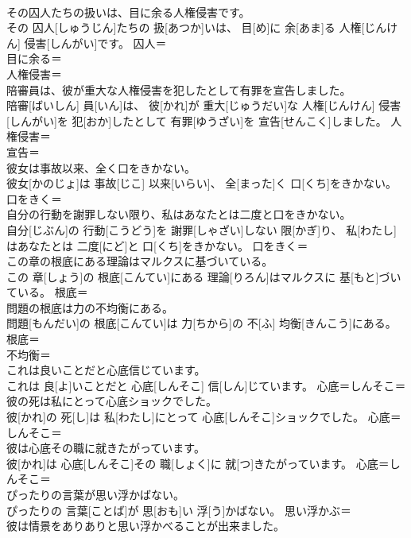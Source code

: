 \documentclass[8pt]{extreport}
\begin{document}
\begin{CJK}{UTF8}{min}
\\	その囚人たちの扱いは、目に余る人権侵害です。	
\\	その 囚人[しゅうじん]たちの 扱[あつか]いは、 目[め]に 余[あま]る 人権[じんけん] 侵害[しんがい]です。	囚人＝ 
\\	目に余る＝ 
\\	人権侵害＝ 
\\	陪審員は、彼が重大な人権侵害を犯したとして有罪を宣告しました。	
\\	陪審[ばいしん] 員[いん]は、 彼[かれ]が 重大[じゅうだい]な 人権[じんけん] 侵害[しんがい]を 犯[おか]したとして 有罪[ゆうざい]を 宣告[せんこく]しました。	人権侵害＝ 
\\	宣告＝ 
\\	彼女は事故以来、全く口をきかない。	
\\	彼女[かのじょ]は 事故[じこ] 以来[いらい]、 全[まった]く 口[くち]をきかない。	口をきく＝ 
\\	自分の行動を謝罪しない限り、私はあなたとは二度と口をきかない。	
\\	自分[じぶん]の 行動[こうどう]を 謝罪[しゃざい]しない 限[かぎ]り、 私[わたし]はあなたとは 二度[にど]と 口[くち]をきかない。	口をきく＝ 
\\	この章の根底にある理論はマルクスに基づいている。	
\\	この 章[しょう]の 根底[こんてい]にある 理論[りろん]はマルクスに 基[もと]づいている。	根底＝ 
\\	問題の根底は力の不均衡にある。	
\\	問題[もんだい]の 根底[こんてい]は 力[ちから]の 不[ふ] 均衡[きんこう]にある。	根底＝ 
\\	不均衡＝ 
\\	これは良いことだと心底信じています。	
\\	これは 良[よ]いことだと 心底[しんそこ] 信[しん]じています。	心底＝しんそこ＝ 
\\	彼の死は私にとって心底ショックでした。	
\\	彼[かれ]の 死[し]は 私[わたし]にとって 心底[しんそこ]ショックでした。	心底＝しんそこ＝ 
\\	彼は心底その職に就きたがっています。	
\\	彼[かれ]は 心底[しんそこ]その 職[しょく]に 就[つ]きたがっています。	心底＝しんそこ＝ 
\\	ぴったりの言葉が思い浮かばない。	
\\	ぴったりの 言葉[ことば]が 思[おも]い 浮[う]かばない。	思い浮かぶ＝ 
\\	彼は情景をありありと思い浮かべることが出来ました。	

\end{CJK}
\end{document}
